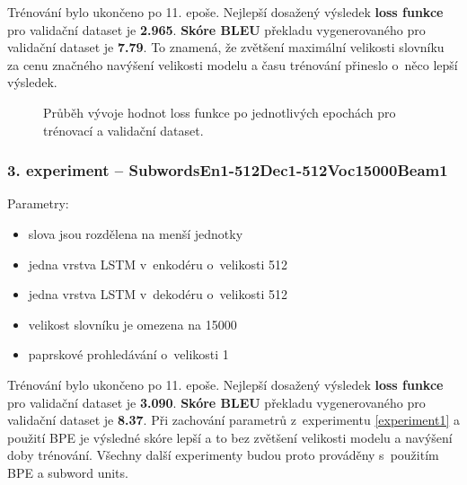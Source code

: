 Trénování bylo ukončeno po 11. epoše. Nejlepší dosažený výsledek \textbf{loss funkce} pro validační dataset je \textbf{2.965}. \textbf{Skóre BLEU} překladu vygenerovaného pro validační dataset je \textbf{7.79}. To znamená, že zvětšení maximální velikosti slovníku za cenu značného navýšení velikosti modelu a času trénování přineslo o~něco lepší výsledek.

\begin{figure}[H]
    \begin{center}
    \end{center}
	\caption{Průběh vývoje hodnot loss funkce po jednotlivých epochách pro trénovací a validační dataset.}
\end{figure}


\subsubsection{3. experiment -- SubwordsEn1-512Dec1-512Voc15000Beam1}\label{experiment3}
Parametry:
\begin{itemize}
  \item slova jsou rozdělena na menší jednotky
  \item jedna vrstva LSTM v~enkodéru o~velikosti 512
  \item jedna vrstva LSTM v~dekodéru o~velikosti 512
  \item velikost slovníku je omezena na 15000
  \item paprskové prohledávání o~velikosti 1
\end{itemize}

Trénování bylo ukončeno po 11. epoše. Nejlepší dosažený výsledek \textbf{loss funkce} pro validační dataset je \textbf{3.090}. \textbf{Skóre BLEU} překladu vygenerovaného pro validační dataset je \textbf{8.37}. Při zachování parametrů z~experimentu \ref{experiment1} a použití BPE je výsledné skóre lepší a to bez zvětšení velikosti modelu a navýšení doby trénování. Všechny další experimenty budou proto prováděny s~použitím BPE a subword units.

